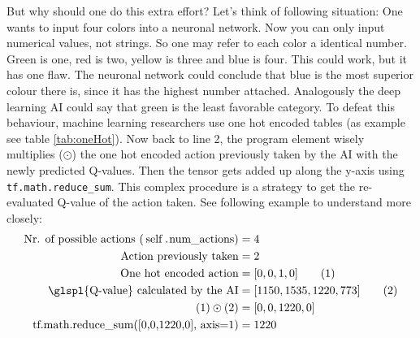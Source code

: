 \documentclass[12pt]{article}
\begin{document}
But why should one do this extra effort? Let's think of following situation: One wants to  \gls{input} four colors into a \gls{neuronal network}. Now you can only  \gls{input} numerical values, not strings. So one may refer to each color a identical number. Green is one, red is two, yellow is three and blue is four. This could work, but it has one flaw. The \gls{neuronal network} could conclude that blue is the most superior colour there is, since it has the highest number attached. Analogously the \gls{deep learning} \gls{AI} could say that green is the least favorable category. To defeat this behaviour, \gls{machine learning} researchers use one hot encoded tables (as example see table \ref{tab:oneHot}). Now back to line 2, the program element wisely multiplies ($\odot$) the one hot encoded action previously taken by the \gls{AI} with the newly predicted \glspl{Q-value}. Then the \gls{tensor} gets added up along the y-axis using \lstinline{tf.math.reduce_sum}. \cite{tf.math.reduce}
This complex procedure is a strategy to get the re-evaluated \gls{Q-value} of the action taken. See following example to understand more closely:
\begin{align}
    \text{Nr. of possible actions (\lstinline{self.num_actions})} &= 4 \notag\\    
    \text{Action previously taken} &= 2 \notag\\
    \text{One hot encoded action} &= [0,0,1,0] \tag{1}\\
    \text{\glspl{Q-value} calculated by the AI} &= [1150, 1535, 1220, 773] \tag{2}\\
    (1)\odot(2) &= [0,0,1220,0] \notag\\
    \text{tf.math.reduce\_sum([0,0,1220,0], axis=1)} &= 1220\notag
\end{align}
\end{document}
